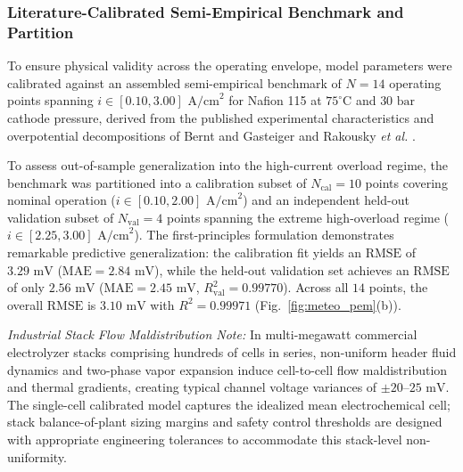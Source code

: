 \documentclass[conference]{IEEEtran}
\begin{document}
\subsubsection{Literature-Calibrated Semi-Empirical Benchmark and Partition}
To ensure physical validity across the operating envelope, model parameters were calibrated against an assembled semi-empirical benchmark of $N = 14$ operating points spanning $i \in [0.10, 3.00]\text{ A/cm}^2$ for Nafion 115 at $75^\circ\text{C}$ and $30\text{ bar}$ cathode pressure, derived from the published experimental characteristics and overpotential decompositions of Bernt and Gasteiger \cite{bernt2016} and Rakousky \textit{et al.} \cite{rakousky2016}.

To assess out-of-sample generalization into the high-current overload regime, the benchmark was partitioned into a calibration subset of $N_{\text{cal}} = 10$ points covering nominal operation ($i \in [0.10, 2.00]\text{ A/cm}^2$) and an independent held-out validation subset of $N_{\text{val}} = 4$ points spanning the extreme high-overload regime ($i \in [2.25, 3.00]\text{ A/cm}^2$). The first-principles formulation demonstrates remarkable predictive generalization: the calibration fit yields an $\text{RMSE}$ of $3.29\text{ mV}$ ($\text{MAE} = 2.84\text{ mV}$), while the held-out validation set achieves an $\text{RMSE}$ of only $2.56\text{ mV}$ ($\text{MAE} = 2.45\text{ mV}$, $R^2_{\text{val}} = 0.99770$). Across all $14$ points, the overall $\text{RMSE}$ is $3.10\text{ mV}$ with $R^2 = 0.99971$ (Fig.~\ref{fig:meteo_pem}(b)).

\textit{Industrial Stack Flow Maldistribution Note:} In multi-megawatt commercial electrolyzer stacks comprising hundreds of cells in series, non-uniform header fluid dynamics and two-phase vapor expansion induce cell-to-cell flow maldistribution and thermal gradients, creating typical channel voltage variances of $\pm 20\text{--}25\text{ mV}$. The single-cell calibrated model captures the idealized mean electrochemical cell; stack balance-of-plant sizing margins and safety control thresholds are designed with appropriate engineering tolerances to accommodate this stack-level non-uniformity.
\end{document}
